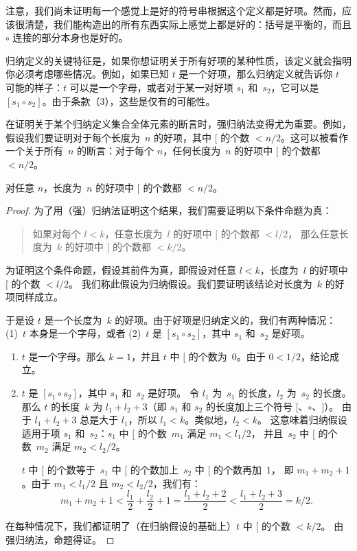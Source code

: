 \documentclass[../../../include/open-logic-section]{subfiles}
\begin{document}
注意，我们尚未证明每一个感觉上是好的符号串根据这个定义都是好项。然而，应该很清楚，我们能构造出的所有东西实际上感觉上都是好的：括号是平衡的，而且 $\circ$ 连接的部分本身也是好的。

归纳定义的关键特征是，如果你想证明关于所有好项的某种性质，该定义就会指明你必须考虑哪些情况。例如，如果已知 $t$ 是一个好项，那么归纳定义就告诉你 $t$ 可能的样子：$t$ 可以是一个字母，或者对于某一对好项 $s_1$ 和~$s_2$，它可以是 $[s_1 \circ s_2]$。由于条款（3），这些是仅有的可能性。

在证明关于某个归纳定义集合全体元素的断言时，强归纳法变得尤为重要。例如，假设我们要证明对于每个长度为~$n$ 的好项，其中 $[$ 的个数 $< n/2$。这可以被看作一个关于所有~$n$ 的断言：对于每个 $n$，任何长度为~$n$ 的好项中 $[$ 的个数都 $< n/2$。

\begin{prop}
  对任意 $n$，长度为~$n$ 的好项中 $[$ 的个数都 $< n/2$。
\end{prop}

\begin{proof}
为了用（强）归纳法证明这个结果，我们需要证明以下条件命题为真：
\begin{quote}
  如果对每个 $l < k$，任意长度为~$l$ 的好项中 $[$ 的个数都 $< l/2$，
  那么任意长度为~$k$ 的好项中 $[$ 的个数都 $< k/2$。
\end{quote}
为证明这个条件命题，假设其前件为真，即假设对任意 $l<k$，长度为~$l$ 的好项中 $[$ 的个数 $< l/2$。
我们称此假设为归纳假设。我们要证明该结论对长度为~$k$ 的好项同样成立。

于是设 $t$ 是一个长度为~$k$ 的好项。由于好项是归纳定义的，我们有两种情况：
(1)~$t$ 本身是一个字母，或者 (2)~$t$ 是 $[s_1 \circ s_2]$，其中 $s_1$ 和~$s_2$ 是好项。
\begin{enumerate}
\item $t$ 是一个字母。那么 $k = 1$，并且 $t$ 中 $[$ 的个数为~$0$。由于 $0 < 1/2$，结论成立。
\item $t$ 是 $[s_1 \circ s_2]$，其中 $s_1$ 和~$s_2$ 是好项。
  令 $l_1$ 为~$s_1$ 的长度，$l_2$ 为~$s_2$ 的长度。
  那么 $t$ 的长度~$k$ 为 $l_1+l_2+3$（即 $s_1$ 和 $s_2$ 的长度加上三个符号 $[$、$\circ$、$]$）。
  由于 $l_1+l_2+3$ 总是大于 $l_1$，所以 $l_1 < k$。类似地，$l_2 < k$。
  这意味着归纳假设适用于项 $s_1$ 和~$s_2$：$s_1$ 中 $[$ 的个数~$m_1$ 满足 $m_1 < l_1/2$，
  并且~$s_2$ 中 $[$ 的个数~$m_2$ 满足 $m_2 < l_2/2$。

  $t$ 中 $[$ 的个数等于~$s_1$ 中 $[$ 的个数加上~$s_2$ 中 $[$ 的个数再加~$1$，
  即 $m_1 + m_2 + 1$。由于 $m_1 < l_1/2$ 且 $m_2 < l_2/2$，我们有：
  \[
  m_1 + m_2 + 1 < \frac{l_1}{2} + \frac{l_2}{2} + 1 = \frac{l_1+l_2+2}{2} < \frac{l_1+l_2+3}{2} = k/2.
  \]
\end{enumerate}
在每种情况下，我们都证明了（在归纳假设的基础上）$t$ 中 $[$ 的个数 $< k/2$。
由强归纳法，命题得证。
\end{proof}
\end{document}
